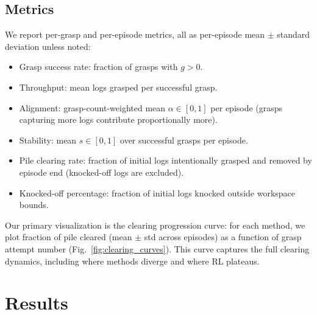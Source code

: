 \documentclass[conference]{IEEEtran}
\begin{document}
\subsection{Metrics}
\label{sec:metrics}
We report per-grasp and per-episode metrics, all as per-episode mean $\pm$ standard deviation unless noted:
\begin{itemize}
    \item Grasp success rate: fraction of grasps with $g>0$.
    \item Throughput: mean logs grasped per successful grasp.
    \item Alignment: grasp-count-weighted mean $\alpha \in [0,1]$ per episode (grasps capturing more logs contribute proportionally more).
    \item Stability: mean $s \in [0,1]$ over successful grasps per episode.
    \item Pile clearing rate: fraction of initial logs intentionally grasped and removed by episode end (knocked-off logs are excluded).
    \item Knocked-off percentage: fraction of initial logs knocked outside workspace bounds.
\end{itemize}
Our primary visualization is the clearing progression curve: for each method, we plot fraction of pile cleared (mean $\pm$ std across episodes) as a function of grasp attempt number (Fig.~\ref{fig:clearing_curves}).
This curve captures the full clearing dynamics, including where methods diverge and where RL plateaus.

\section{Results}
\label{sec:results}
\end{document}
